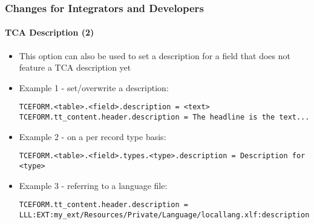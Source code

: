 \begin{frame}[fragile]
	\frametitle{Changes for Integrators and Developers}
	\framesubtitle{TCA Description (2)}


	\begin{itemize}
		\item This option can also be used to set a description for a field
			that does not feature a TCA description yet
	\end{itemize}

	\begin{itemize}
		\item Example 1 - set/overwrite a description:
\begin{lstlisting}
TCEFORM.<table>.<field>.description = <text>
TCEFORM.tt_content.header.description = The headline is the text...
\end{lstlisting}
		\item Example 2 - on a per record type basis:
\begin{lstlisting}
TCEFORM.<table>.<field>.types.<type>.description = Description for <type>
\end{lstlisting}
		\item Example 3 - referring to a language file:
\begin{lstlisting}
TCEFORM.tt_content.header.description = LLL:EXT:my_ext/Resources/Private/Language/locallang.xlf:description
\end{lstlisting}

	\end{itemize}

\end{frame}

